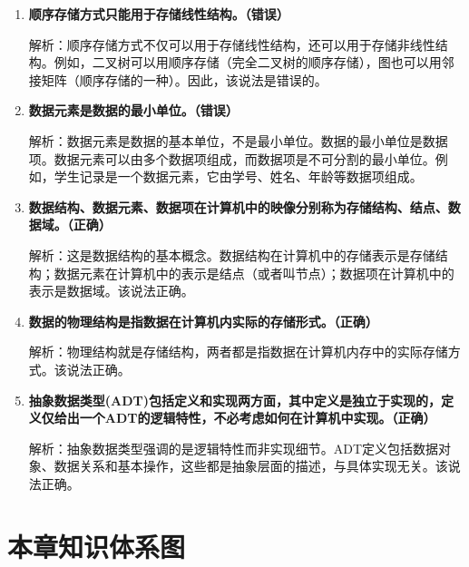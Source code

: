 \documentclass[12pt, a4paper]{article}
\begin{document}
\begin{enumerate}
	\item \textbf{顺序存储方式只能用于存储线性结构。（错误）}

	      解析：顺序存储方式不仅可以用于存储线性结构，还可以用于存储非线性结构。例如，二叉树可以用顺序存储（完全二叉树的顺序存储），图也可以用邻接矩阵（顺序存储的一种）。因此，该说法是错误的。

	\item \textbf{数据元素是数据的最小单位。（错误）}

	      解析：数据元素是数据的基本单位，不是最小单位。数据的最小单位是数据项。数据元素可以由多个数据项组成，而数据项是不可分割的最小单位。例如，学生记录是一个数据元素，它由学号、姓名、年龄等数据项组成。

	\item \textbf{数据结构、数据元素、数据项在计算机中的映像分别称为存储结构、结点、数据域。（正确）}

	      解析：这是数据结构的基本概念。数据结构在计算机中的存储表示是存储结构；数据元素在计算机中的表示是结点（或者叫节点）；数据项在计算机中的表示是数据域。该说法正确。

	\item \textbf{数据的物理结构是指数据在计算机内实际的存储形式。（正确）}

	      解析：物理结构就是存储结构，两者都是指数据在计算机内存中的实际存储方式。该说法正确。

	\item \textbf{抽象数据类型(ADT)包括定义和实现两方面，其中定义是独立于实现的，定义仅给出一个ADT的逻辑特性，不必考虑如何在计算机中实现。（正确）}

	      解析：抽象数据类型强调的是逻辑特性而非实现细节。ADT定义包括数据对象、数据关系和基本操作，这些都是抽象层面的描述，与具体实现无关。该说法正确。
\end{enumerate}

\section{本章知识体系图}
\end{document}
